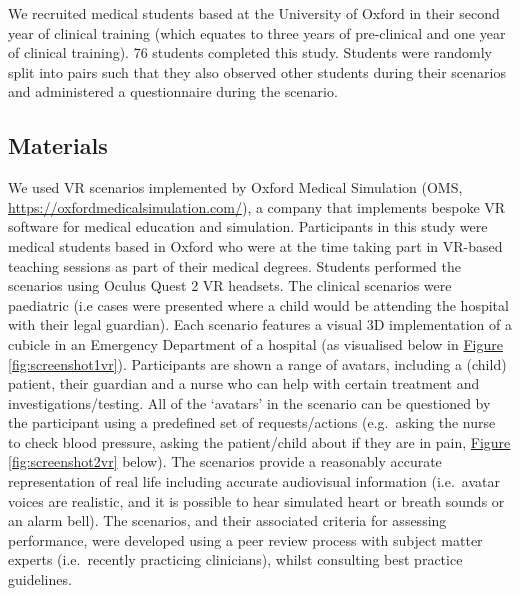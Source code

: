 \documentclass[a4paper, nobind]{templates/ociamthesis}
\begin{document}
We recruited medical students based at the University of Oxford in their second year of clinical training (which equates to three years of pre-clinical and one year of clinical training). 76 students completed this study. Students were randomly split into pairs such that they also observed other students during their scenarios and administered a questionnaire during the scenario.

\subsection{Materials}\label{materials-2}

We used VR scenarios implemented by Oxford Medical Simulation (OMS, \url{https://oxfordmedicalsimulation.com/}), a company that implements bespoke VR software for medical education and simulation. Participants in this study were medical students based in Oxford who were at the time taking part in VR-based teaching sessions as part of their medical degrees. Students performed the scenarios using Oculus Quest 2 VR headsets. The clinical scenarios were paediatric (i.e cases were presented where a child would be attending the hospital with their legal guardian). Each scenario features a visual 3D implementation of a cubicle in an Emergency Department of a hospital (as visualised below in \hyperref[fig:screenshot1vr]{Figure \ref{fig:screenshot1vr}}). Participants are shown a range of avatars, including a (child) patient, their guardian and a nurse who can help with certain treatment and investigations/testing. All of the `avatars' in the scenario can be questioned by the participant using a predefined set of requests/actions (e.g.~asking the nurse to check blood pressure, asking the patient/child about if they are in pain, \hyperref[fig:screenshot2vr]{Figure \ref{fig:screenshot2vr}} below). The scenarios provide a reasonably accurate representation of real life including accurate audiovisual information (i.e.~avatar voices are realistic, and it is possible to hear simulated heart or breath sounds or an alarm bell). The scenarios, and their associated criteria for assessing performance, were developed using a peer review process with subject matter experts (i.e.~recently practicing clinicians), whilst consulting best practice guidelines.

\newpage
\end{document}
